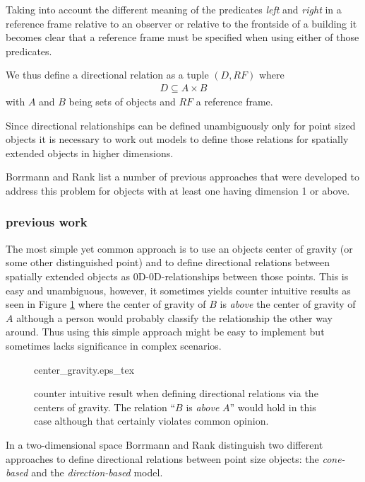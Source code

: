 \documentclass[paper=a4, fontsize=11pt]{scrartcl} %
\numberwithin{equation}{section} %
\numberwithin{figure}{section} %
\numberwithin{table}{section} %
\begin{document}
Taking into account the different meaning of the predicates \emph{left} and \emph{right} in a reference frame relative to an observer or relative to the frontside of a building it becomes clear that a reference frame must be specified when using either of those predicates.

We thus define a directional relation as a tuple $(D,RF)$ where  
\begin{align*}
 D \subseteq A \times B 
\end{align*}
with $A$ and $B$ being sets of objects and $RF$ a reference frame.

Since directional relationships can be defined unambiguously only for point sized objects it is necessary to work out models to define those relations for spatially extended objects in higher dimensions. 

Borrmann and Rank \cite{Borrmann:2009:AEI} list a number of previous approaches that were developed to address this problem for objects with at least one having dimension 1 or above.

\subsubsection{previous work}
The most simple yet common approach is to use an objects center of gravity (or some other distinguished point) and to define directional relations between spatially extended objects as 0D-0D-relationships between those points. This is easy and unambiguous, however, it sometimes yields counter intuitive results as seen in Figure \ref{fig:center_gravity} where the center of gravity of $B$ is \emph{above} the center of gravity of $A$ although a person would probably classify the relationship the other way around. Thus using this simple approach might be easy to implement but sometimes lacks significance in complex scenarios.

\begin{figure}
  \centering
  \def\svgwidth{10em}
  {center_gravity.eps_tex}
  \caption{counter intuitive result when defining directional relations via the centers of gravity. The relation ``$B$ is \emph{above} $A$'' would hold in this case although that certainly violates common opinion.  }
\label{fig:center_gravity}
\end{figure}

In a two-dimensional space Borrmann and Rank \cite{Borrmann:2009:AEI} distinguish two different approaches to define directional relations between point size objects: the \textit{cone-based} and the \textit{direction-based} model. 
\end{document}
